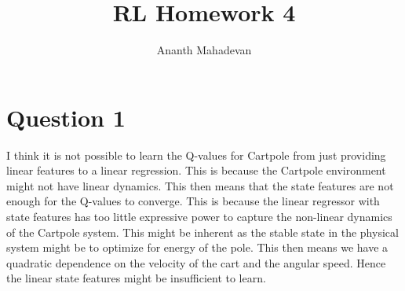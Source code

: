 \documentclass[a4paper]{article}
\title{RL Homework 4}
\author{Ananth Mahadevan}
\begin{document}
\maketitle
\clearpage


\section*{Question 1}
I think it is not possible to learn the Q-values for Cartpole from just providing linear features to a linear regression. This is because the Cartpole environment might not have linear dynamics. This then means that the state features are not enough for the Q-values to converge. This is because the linear regressor with state features has too little expressive power to capture the non-linear dynamics of the Cartpole system. This might be inherent as the stable state in the physical system might be to optimize for energy of the pole. This then means we have a quadratic dependence on the velocity of the cart and the angular speed. Hence the linear state features might be insufficient to learn.
\end{document}

